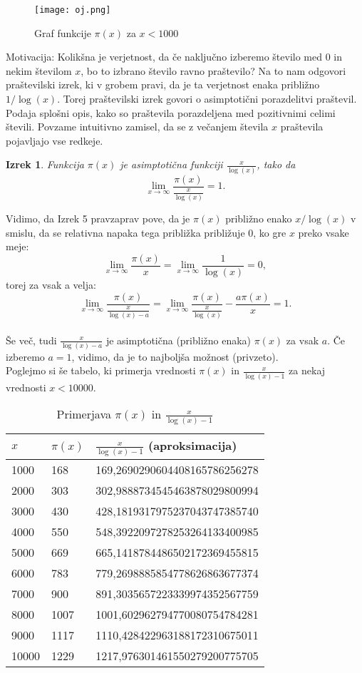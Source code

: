 \documentclass[a4paper,12pt]{article}
\newtheorem{izrek}{Izrek}
\begin{document}
\begin{figure}[!ht]
	\centering
	\texttt{[image: oj.png]}
	\caption{Graf funkcije $\pi(x)$ za $x < 1000$}
\end{figure}

\newpage
\noindent Motivacija: Kolikšna je verjetnost, da če naključno izberemo število med $0$
in nekim številom $x$, bo to izbrano število ravno praštevilo? Na to nam odgovori
praštevilski izrek, ki v grobem pravi, da je ta verjetnost enaka približno
$1/ \log(x)$. Torej praštevilski izrek govori o asimptotični porazdelitvi praštevil.
Podaja splošni opis, kako so praštevila porazdeljena med pozitivnimi celimi števili.
Povzame intuitivno zamisel, da se z večanjem števila $x$ praštevila pojavljajo
vse redkeje.

\begin{izrek}
	Funkcija $\pi(x)$ je asimptotična funkciji $\frac{x}{\log(x)}$, tako da
	$$\lim_{x\to\infty}\frac{\pi(x)}{\frac{x}{\log(x)}} = 1.$$
\end{izrek}
Vidimo, da Izrek 5 pravzaprav pove, da je $\pi(x)$ približno enako $x/ \log(x)$ v smislu,
da se relativna napaka tega približka približuje $0$, ko gre $x$ preko vsake
meje:
$$\lim_{x\to\infty}\frac{\pi(x)}{x} = \lim_{x\to\infty}\frac{1}{\log(x)} = 0,$$
torej za vsak a velja:
$$\lim_{x\to\infty}\frac{\pi(x)}{\frac{x}{\log(x)-a}} = \lim_{x\to\infty}\frac{\pi(x)}{\frac{x}{\log(x)}} - \frac{a\pi(x)}{x}= 1.$$
\\
Še več, tudi $\frac{x}{\log(x)-a}$ je asimptotična (približno enaka) $\pi(x)$ za vsak $a$. Če izberemo
$a = 1$, vidimo, da je to najboljša možnost (privzeto).
\\
\newpage
\noindent Poglejmo si še tabelo, ki primerja vrednosti $\pi(x)$ in $\frac{x}
{\log(x)-1}$ za nekaj vrednosti
$x < 10000$.
\begin{table}[!ht]
	\centering
	\label{my-label}
	\begin{tabular}{|l|l|l|}
		\hline
		$x$   & $\pi(x)$ & $\frac{x}{\log(x)-1}$ (aproksimacija) \\ \hline
		1000  & 168      & 169,2690290604408165786256278         \\
		2000  & 303      & 302,9888734545463878029800994         \\
		3000  & 430      & 428,1819317975237043747385740         \\
		4000  & 550      & 548,3922097278253264133400985         \\
		5000  & 669      & 665,1418784486502172369455815         \\
		6000  & 783      & 779,2698885854778626863677374         \\
		7000  & 900      & 891,3035657223339974352567759         \\
		8000  & 1007     & 1001,602962794770080754784281         \\
		9000  & 1117     & 1110,428422963188172310675011         \\
		10000 & 1229     & 1217,976301461550279200775705         \\ \hline
	\end{tabular}
	\caption{Primerjava $\pi(x)$ in $\frac{x}{\log(x)-1}$}
\end{table}
\end{document}
